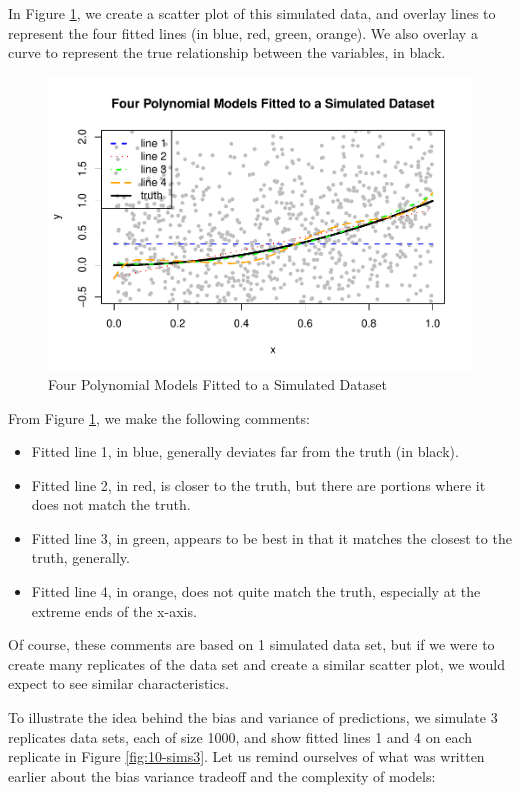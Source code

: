 \documentclass[
]{book}
\providecommand{\tightlist}{%
  \setlength{\itemsep}{0pt}\setlength{\parskip}{0pt}}
\begin{document}
In Figure \ref{fig:10-sims1}, we create a scatter plot of this simulated data, and overlay lines to represent the four fitted lines (in blue, red, green, orange). We also overlay a curve to represent the true relationship between the variables, in black.

\begin{figure}
\centering
\includegraphics{bookdown-demo_files/figure-latex/10-sims1-1.pdf}
\caption{\label{fig:10-sims1}Four Polynomial Models Fitted to a Simulated Dataset}
\end{figure}

From Figure \ref{fig:10-sims1}, we make the following comments:

\begin{itemize}
\tightlist
\item
  Fitted line 1, in blue, generally deviates far from the truth (in black).
\item
  Fitted line 2, in red, is closer to the truth, but there are portions where it does not match the truth.
\item
  Fitted line 3, in green, appears to be best in that it matches the closest to the truth, generally.
\item
  Fitted line 4, in orange, does not quite match the truth, especially at the extreme ends of the x-axis.
\end{itemize}

Of course, these comments are based on 1 simulated data set, but if we were to create many replicates of the data set and create a similar scatter plot, we would expect to see similar characteristics.

To illustrate the idea behind the bias and variance of predictions, we simulate 3 replicates data sets, each of size 1000, and show fitted lines 1 and 4 on each replicate in Figure \ref{fig:10-sims3}. Let us remind ourselves of what was written earlier about the bias variance tradeoff and the complexity of models:
\end{document}
